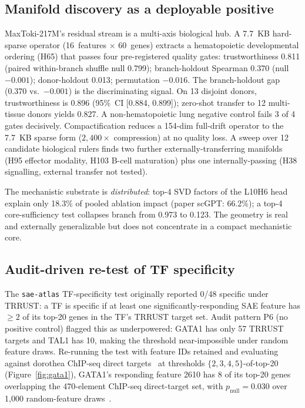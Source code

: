 \documentclass{article}
\newcommand{\maxtoki}{MaxToki-217M\xspace}
\begin{document}
\subsection{Manifold discovery as a deployable positive}
\label{sec:manifold}

\maxtoki{}'s residual stream is a multi-axis biological hub. A
7.7~KB hard-sparse operator (16~features $\times$ 60~genes)
extracts a hematopoietic developmental ordering (H65) that passes
four pre-registered quality gates: trustworthiness 0.811 (paired
within-branch shuffle null 0.799); branch-holdout Spearman 0.370
(null $-0.001$); donor-holdout 0.013; permutation $-0.016$. The
branch-holdout gap (0.370 vs.~$-0.001$) is the discriminating
signal. On 13 disjoint donors, trustworthiness is 0.896 (95\%~CI
[0.884, 0.899]); zero-shot transfer to 12 multi-tissue donors
yields 0.827. A non-hematopoietic lung negative control fails 3 of
4 gates decisively. Compactification reduces a 154-dim full-drift
operator to the 7.7~KB sparse form ($2{,}400\times$ compression)
at no quality loss. A sweep over 12 candidate biological rulers
finds two further externally-transferring manifolds (H95 effector
modality, H103 B-cell maturation) plus one
internally-passing (H38 signalling, external transfer not
tested).

The mechanistic substrate is \emph{distributed}: top-4 SVD factors
of the L10H6 head explain only 18.3\% of pooled ablation impact
(paper scGPT: 66.2\%); a top-4 core-sufficiency test collapses
branch from 0.973 to 0.123. The geometry is real and externally
generalizable but does not concentrate in a compact mechanistic
core.

\subsection{Audit-driven re-test of TF specificity}
\label{sec:gata1_inversion}

The \texttt{sae-atlas} TF-specificity test originally reported
0/48 specific under TRRUST: a TF is specific if at least one
significantly-responding SAE feature has $\geq 2$ of its top-20
genes in the TF's TRRUST target set. Audit pattern P6 (no positive
control) flagged this as underpowered: GATA1 has only 57 TRRUST
targets and TAL1 has 10, making the threshold near-impossible
under random feature draws. Re-running the test with feature IDs
retained and evaluating against dorothea ChIP-seq direct
targets~\citep{garcia-alonso2019dorothea} at thresholds
$\{2,3,4,5\}$-of-top-20 (Figure~\ref{fig:gata1}), GATA1's
responding feature 2610 has 8 of its top-20 genes overlapping the
470-element ChIP-seq direct-target set, with $p_{\text{null}} =
0.030$ over 1{,}000 random-feature
draws~\citep{phipson2010permp}.
\end{document}
